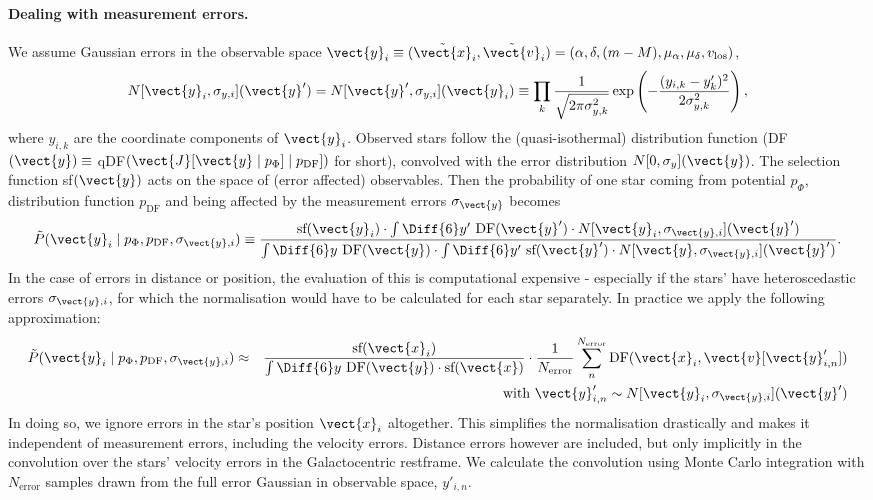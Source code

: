 
\paragraph{Dealing with measurement errors.} 

We assume Gaussian errors in the observable space $\vect{y}_i \equiv (\tilde{\vect{x}}_i,\tilde{\vect{v}}_i)=(\alpha,\delta,(m-M),\mu_\alpha,\mu_\delta,v_\text{los})$,
\begin{equation*}
N[\vect{y}_i,\sigma_{y,i}](\vect{y}') = N[\vect{y}',\sigma_{y,i}](\vect{y}_i) \equiv  \prod_k \frac{1}{\sqrt{2\pi\sigma_{y,k}^2}} \exp\left( -\frac{(y_{i,k}-y_k')^2}{2\sigma_{y,k}^2}\right),
\end{equation*}
where $y_{i,k}$ are the coordinate components of $\vect{y}_i$. Observed stars follow the (quasi-isothermal) distribution function (DF$(\vect{y}) \equiv$ qDF$(\vect{J}[\vect{y} \mid p_\Phi] \mid p_\text{DF}])$ for short), convolved with the error distribution $N[0,\sigma_{y}](\vect{y})$. The selection function sf$(\vect{y})$ acts on the space of (error affected) observables. 
Then the probability of one star coming from potential $p_\Phi$, distribution function $p_\text{DF}$ and being affected by the measurement errors $\sigma_{\vect{y}}$ becomes
\begin{eqnarray*}
\tilde{P}(\vect{y}_i \mid p_\Phi,p_\text{DF},\sigma_{\vect{y},i}) \equiv \frac{\text{sf}(\vect{y}_i) \cdot \int \Diff{6} y' \  \text{DF}(\vect{y}') \cdot N[\vect{y}_i,\sigma_{\vect{y},i}](\vect{y}')}{\int \Diff{6}y  \  \text{DF}(\vect{y})  \cdot  \int \Diff{6} y' \  \text{sf}(\vect{y}')  \cdot N[\vect{y},\sigma_{\vect{y},i}](\vect{y}')}.
\end{eqnarray*}
In the case of errors in distance or position, the evaluation of this is computational expensive - especially if the stars' have heteroscedastic errors $\sigma_{\vect{y},i}$, for which the normalisation would have to be calculated for each star separately. In practice we apply the following approximation:
\begin{eqnarray}
\tilde{P}(\vect{y}_i \mid p_\Phi,p_\text{DF},\sigma_{\vect{y},i}) &\approx& \frac{ \text{sf}(\vect{x}_i)}{\int \Diff{6}y  \  \text{DF}(\vect{y})  \cdot   \text{sf}(\vect{x})} \cdot \frac{1}{N_\text{error}} \sum_n^{N_\text{error}}  \text{DF}(\vect{x}_i,\vect{v}[\vect{y}'_{i,n}])\\
&& \text{with } \vect{y}'_{i,n} \sim N[\vect{y}_i,\sigma_{\vect{y},i}](\vect{y}')\nonumber\\
\end{eqnarray}
In doing so, we ignore errors in the star's position $\vect{x}_i$ altogether. This simplifies the normalisation drastically and makes it independent of measurement errors, including the velocity errors. Distance errors however are included, but only implicitly in the convolution over the stars' velocity errors in the Galactocentric restframe. We calculate the convolution using Monte Carlo integration with $N_\text{error}$ samples drawn from the full error Gaussian in observable space, $y'_{i,n}$. 
